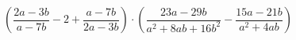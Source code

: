 \begin{ex}[type=expression]
	\begin{condition}
		\( \left( \dfrac{2a-3b}{a-7b}-2+\dfrac{a-7b}{2a-3b} \right)\cdot\left( \dfrac{23a-29b}{a^2+8ab+16b^2}-\dfrac{15a-21b}{a^2+4ab} \right) \)
	\end{condition}
\end{ex}